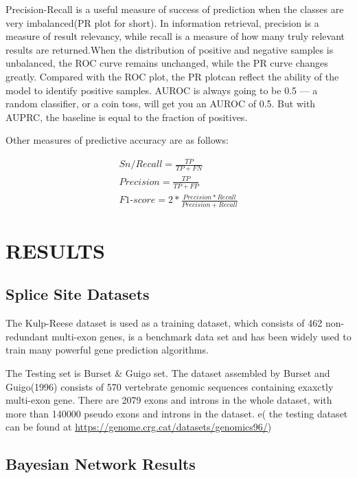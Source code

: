 \documentclass{gapd}
\begin{document}
Precision-Recall is a useful measure of success of prediction when the
classes are very imbalanced(PR plot for short). In information
retrieval, precision is a measure of result relevancy, while recall is a
measure of how many truly relevant results are returned.When the
distribution of positive and negative samples is unbalanced, the ROC
curve remains unchanged, while the PR curve changes greatly. Compared
with the ROC plot, the PR plotcan reflect the ability of the model to
identify positive samples. AUROC is always going to be 0.5 --- a random
classifier, or a coin toss, will get you an AUROC of 0.5. But with
AUPRC, the baseline is equal to the fraction of positives.

Other measures of predictive accuracy are as follows:

\begin{gather*}%
  Sn/Recall = \frac{TP}{TP+FN} \\
  Precision = \frac{TP}{TP+FP} \\
  F1\text{-}score =2* \frac{Precision*Recall}{Precision+Recall}
\end{gather*}

\section{RESULTS}\label{results}

\subsection{Splice Site Datasets}\label{splice-site-datasets}

The Kulp-Reese dataset is used as a training dataset, which consists of
462 non-redundant multi-exon genes, is a benchmark data set and has been
widely used to train many powerful gene prediction algorithms.

The Testing set is Burset \& Guigo set. The dataset assembled by Burset
and Guigo(1996) consists of 570 vertebrate genomic sequences containing
exaxctly multi-exon gene. There are 2079 exons and introns in the whole
dataset, with more than 140000 pseudo exons and introns in the dataset.
e( the testing dataset can be found at
\url{https://genome.crg.cat/datasets/genomics96/})

\subsection{Bayesian Network Results}\label{bayesian-network-results}
\end{document}
